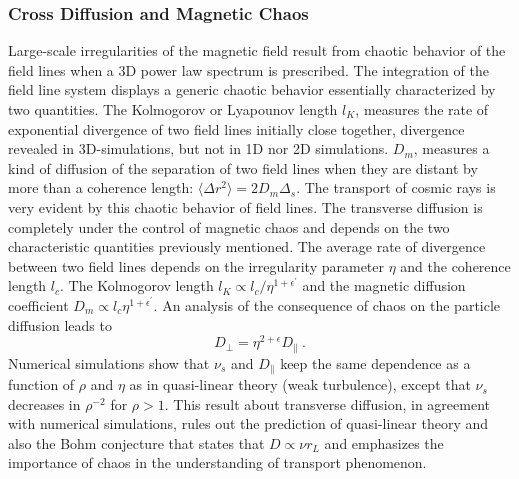 \documentclass[12pt,a4paper]{article}
\begin{document}
\subsubsection{Cross Diffusion and Magnetic Chaos}
Large-scale irregularities of the magnetic field result from chaotic behavior of the field lines when a 3D power law spectrum is prescribed. The integration of the field line system displays a generic chaotic behavior essentially characterized by two quantities. The Kolmogorov or Lyapounov length $l_K$, measures the rate of exponential divergence of two field lines initially close together, divergence revealed in 3D-simulations, but not in 1D nor 2D simulations. $D_m$, measures a kind of diffusion of the separation of two field lines when they are distant by more than a coherence length: $\langle \Delta r^2 \rangle = 2D_m \Delta_s$. The transport of cosmic rays is very evident by this chaotic behavior of field lines. The transverse diffusion is completely under the control of magnetic chaos and depends on the two characteristic quantities previously mentioned. The average rate of divergence between two field lines depends on the irregularity parameter $\eta$ and the coherence length $l_c$. The Kolmogorov length $l_K \propto l_c/\eta^{1+\epsilon^\prime}$ and the magnetic diffusion coefficient $D_m \propto l_c \eta^{1+\epsilon^\prime}$. An analysis of the consequence of chaos on the particle diffusion leads to 
\begin{equation}
D_\perp = \eta^{2+\epsilon} D_\parallel ~.
\end{equation}
Numerical simulations show that $\nu_s$ and $D_\parallel$ keep the same dependence as a function of $\rho$ and $\eta$ as in quasi-linear theory (weak turbulence), except that $\nu_s$ decreases in $\rho^{-2}$ for $\rho > 1$. This result about transverse diffusion, in agreement with numerical simulations, rules out the prediction of quasi-linear theory and also the Bohm conjecture that states that $D \propto \nu r_L$ and emphasizes the importance of chaos in the understanding of transport phenomenon. 
\end{document}

